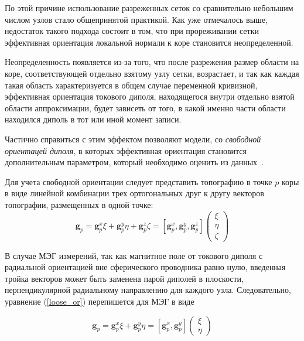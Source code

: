По этой причине использование разреженных сеток со сравнительно небольшим числом узлов стало
общепринятой практикой. Как уже отмечалось выше, недостаток такого подхода состоит в том, что
при прореживании сетки эффективная ориентация локальной нормали к коре становится неопределенной.

Неопределенность появляется из-за того, что после разрежения размер области на коре, соответствующей отдельно
взятому узлу сетки, возрастает, и так как каждая такая область характеризуется в общем случае
переменной кривизной, эффективная ориентация токового диполя, находящегося внутри отдельно взятой области аппроксимации,
будет зависеть от того, в какой именно части области находился диполь в тот или иной момент записи.

Частично справиться с этим эффектом позволяют модели, со \emph{свободной ориентацей диполя},
в которых эффективная ориентация становится дополнительным параметром, который необходимо оценить из данных~\cite{Lin2006}.

Для учета свободной ориентации следует представить топографию в точке $p$ коры в виде линейной
комбинации трех ортогональных друг к другу векторов топографии, размещенных в одной точке:
\begin{equation}
    \mathbf{g}_p = \mathbf{g}_p^x \xi + \mathbf{g}_p^y \eta + \mathbf{g}_p^z \zeta =
    [\mathbf{g}_p^x, \mathbf{g}_p^y, \mathbf{g}_p^z] \left(
    \begin{array}{ccc}
        \xi \\
        \eta \\
        \zeta
    \end{array}
    \right)
    \label{loose_or}
\end{equation}

В случае МЭГ измерений, так как магнитное поле от токового диполя с радиальной ориентацией вне сферического проводника равно нулю,
введенная тройка векторов может быть заменена парой диполей в плоскости, перпендикулярной радиальному направлению для каждого узла.
Следовательно, уравнение (\ref{loose_or}) перепишется для МЭГ в виде

\begin{equation}
    \mathbf{g}_p = \mathbf{g}_p^x \xi + \mathbf{g}_p^y \eta = [\mathbf{g}_p^x, \mathbf{g}_p^y] \left(
    \begin{array}{ccc}
        \xi \\
        \eta
    \end{array}
    \right)
    \label{loose_or_meg}
\end{equation}

